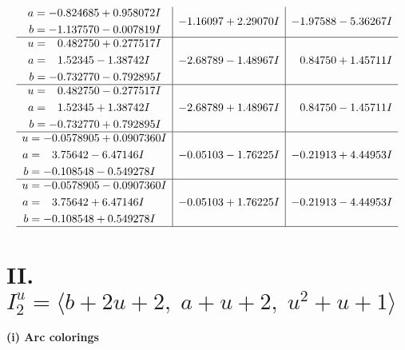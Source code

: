 \documentclass[1p]{elsarticle_modified}
\theoremstyle{definition}
\begin{document}
$$\begin{array}{c|c|c}
\begin{aligned}
a &= -0.824685 + 0.958072 I \\
b &= -1.137570 - 0.007819 I\end{aligned}
 & -1.16097 + 2.29070 I & -1.97588 - 5.36267 I \\ \hline\begin{aligned}
u &= \phantom{-}0.482750 + 0.277517 I \\
a &= \phantom{-}1.52345 - 1.38742 I \\
b &= -0.732770 - 0.792895 I\end{aligned}
 & -2.68789 - 1.48967 I & \phantom{-}0.84750 + 1.45711 I \\ \hline\begin{aligned}
u &= \phantom{-}0.482750 - 0.277517 I \\
a &= \phantom{-}1.52345 + 1.38742 I \\
b &= -0.732770 + 0.792895 I\end{aligned}
 & -2.68789 + 1.48967 I & \phantom{-}0.84750 - 1.45711 I \\ \hline\begin{aligned}
u &= -0.0578905 + 0.0907360 I \\
a &= \phantom{-}3.75642 - 6.47146 I \\
b &= -0.108548 - 0.549278 I\end{aligned}
 & -0.05103 - 1.76225 I & -0.21913 + 4.44953 I \\ \hline\begin{aligned}
u &= -0.0578905 - 0.0907360 I \\
a &= \phantom{-}3.75642 + 6.47146 I \\
b &= -0.108548 + 0.549278 I\end{aligned}
 & -0.05103 + 1.76225 I & -0.21913 - 4.44953 I\\
 \hline 
 \end{array}$$\newpage\newpage\renewcommand{\arraystretch}{1}
\centering \section*{II. $I^u_{2}= \langle b+2 u+2,\;a+u+2,\;u^2+u+1 \rangle$}
\flushleft \textbf{(i) Arc colorings}\\
\end{document}
